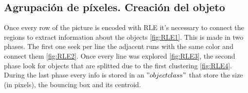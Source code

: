 \subsection{Agrupaci\'on de p\'ixeles. Creaci\'on del objeto}

Once every row of the picture is encoded with RLE it's necessary to connect the regions to extract information about the objects \ref{fig:RLE1}. This is made in two phases. The first one seek per line the adjacent runs with the same color and connect them \ref{fig:RLE2}. Once every line was explored \ref{fig:RLE3}, the second phase look for objects that are splitted due to the first clustering \ref{fig:RLE4}. During the last phase every info is stored in an $"object class"$ that store the size (in pixels), the bouncing box and its centroid.

